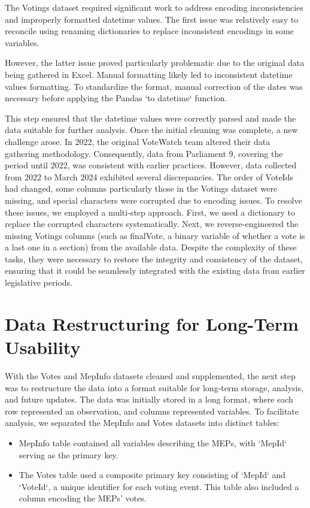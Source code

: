 \documentclass{report}
\begin{document}
    The Votings dataset required significant work to address encoding inconsistencies and improperly formatted
    datetime
    values. The first issue was relatively easy to reconcile using renaming dictionaries to replace inconsistent
    encodings in some variables.

    However, the latter issue proved particularly problematic due to the original data being gathered in Excel.
    Manual
    formatting likely led to inconsistent datetime values formatting. To standardize the format, manual
    correction of
    the dates was necessary before applying the Pandas `to datetime` function.

    This step ensured that the datetime values were correctly parsed and made the data suitable for further
    analysis.
    Once the initial cleaning was complete, a new challenge arose. In 2022, the original VoteWatch team altered
    their
    data gathering methodology. Consequently, data from Parliament 9, covering the period until 2022, was
    consistent
    with earlier practices. However, data collected from 2022 to March 2024 exhibited several discrepancies. The
    order
    of VoteIds had changed, some columns particularly those in the Votings dataset were missing, and special
    characters
    were corrupted due to encoding issues.
    To resolve these issues, we employed a multi-step approach. First, we used a dictionary to replace the
    corrupted
    characters systematically. Next, we reverse-engineered the missing Votings columns (such as finalVote, a
    binary
    variable of whether a vote is a last one in a section) from the available data. Despite the complexity of
    these
    tasks, they were necessary to restore the integrity and consistency of the dataset, ensuring that it could
    be
    seamlessly integrated with the existing data from earlier legislative periods.


    \section{Data Restructuring for Long-Term Usability}

    With the Votes and MepInfo datasets cleaned and supplemented, the next step was to restructure the data into
    a
    format suitable for long-term storage, analysis, and future updates. The data was initially stored in a long
    format,
    where each row represented an observation, and columns represented variables. To facilitate analysis, we
    separated
    the MepInfo and Votes datasets into distinct tables:
    \begin{itemize}
        \item
        MepInfo table contained all variables describing the MEPs, with `MepId` serving as the primary key.
        \item
        The Votes table used a composite primary key consisting of `MepId` and `VoteId`, a unique identifier for
        each
        voting event. This table also included a column encoding the MEPs' votes.
    \end{itemize}
\end{document}
